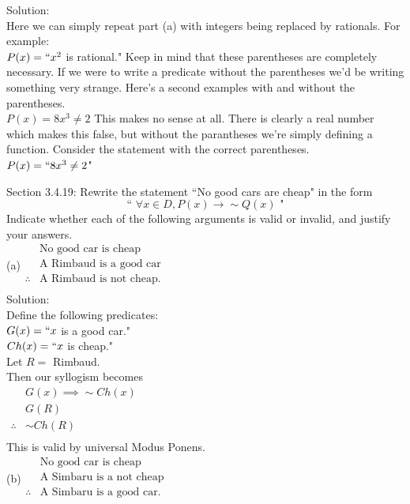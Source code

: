 \documentclass[10 pt]{amsart}
\theoremstyle{definition}
\theoremstyle{remark}
\numberwithin{equation}{subsection}
\begin{document}
Solution:\\
Here we can simply repeat part (a) with integers being replaced by rationals.  For example:\\
$P(x) = ``x^2$ is rational."  Keep in mind that these parentheses are completely necessary.  If we were to write a predicate without the parentheses we'd be writing something very strange. Here's a second examples with and without the parentheses.\\
$P(x) = 8x^3 \neq 2$  This makes no sense at all.  There is clearly a real number which makes this false, but without the parantheses we're simply defining a function.  Consider the statement with the correct parentheses.\\
$P(x) = ``8x^3 \neq 2$" 





\newpage

Section 3.4.19: Rewrite the statement ``No good cars are cheap"
in the form 
\[
\text{`` }\forall x\in D, P(x) \rightarrow \sim Q(x)\text{ "}
\]
Indicate whether each of the following arguments is valid or invalid, and justify your answers.\\

(a)$\begin{array}{rl}
&\text{No good car is cheap}\\
&\text{A Rimbaud is a good car}\\
\therefore & \text{A Rimbaud is not cheap.}\\
\end{array}$\\


Solution:\\
Define the following predicates:\\
$G(x) = ``x$ is a good car."\\
$Ch(x) = ``x$ is cheap."\\
Let $R = $ Rimbaud.\\
Then our syllogism becomes\\

$\begin{array}{rl}
& G(x) \implies \sim Ch(x)\\
& G(R)\\
\therefore & \sim Ch(R)\\
\end{array}$\\
This is valid by universal Modus Ponens.\\


(b)$\begin{array}{rl}
&\text{No good car is cheap}\\
&\text{A Simbaru is a not cheap}\\
\therefore & \text{A Simbaru is a good car.}\\
\end{array}$\\
\end{document}
